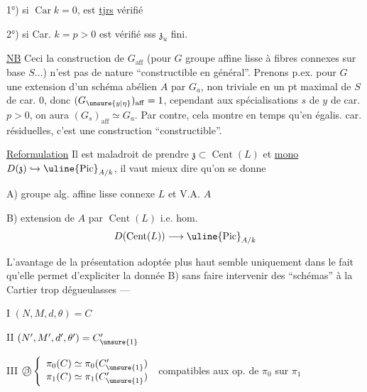 1°) si $\operatorname{Car}k=0$,  est \uline{tjrs} vérifié

2°) si Car. $k=p>0$ est vérifié sss $\mathfrak z_u$ fini.


\uline{NB} Ceci    la construction de $G_{\mathrm{aff}}$  (pour $G$
groupe affine lisse à fibres connexes sur base $S\ldots$) n'est pas
de nature ``constructible en général''. Prenons p.ex. pour $G$
une extension d'un schéma abélien $A$ par $G_a$, non triviale
en un pt maximal  de $S$ de car. 0, donc $(G_\unsure{y|\eta})_{\mathrm{aff}}=1$, cependant
aux  spécialisations $s$ de $y$ de car. $p>0$, on aura $(G_s)_{\mathrm{aff}}\simeq G_a$.
Par contre, cela montre en  temps qu'en égalis. car.
résiduelles, c'est une construction  ``constructible''.

\uline{Reformulation} Il est maladroit de prendre $\mathfrak z\subset\operatorname{Cent}(L)$ et
\uline{mono}  $D(\mathfrak z)\hookrightarrow\uline{\operatorname{Pic}}_{A/k}$, il vaut mieux dire qu'on se
donne

A) groupe alg. affine lisse connexe $L$ et V.A. $A$

B) extension de $A$ par $\operatorname{Cent}(L)$ i.e. hom.
\[D(\operatorname{Cent}(L))\longrightarrow\uline{\operatorname{Pic}}_{A/k}\]

L'avantage de la présentation adoptée plus haut semble
uniquement dans le fait qu'elle permet d'expliciter
la donnée B) sans faire intervenir des ``schémas'' à la
Cartier trop dégueulasses ---

I \quad $(N,M,d,\theta)=C$



II \quad $(N',M',d',\theta')=C'_{\unsure{1}}$

III \quad $\text{\textcircled{$\beta$}}\left\{
\begin{array}{l}\pi_0(C)\simeq\pi_0(C'_{\unsure{1}})\\
\pi_1(C)\simeq\pi_1(C'_{\unsure{1}})
\end{array}\right.$ compatibles aux op. de $\pi_0$ sur $\pi_1$


